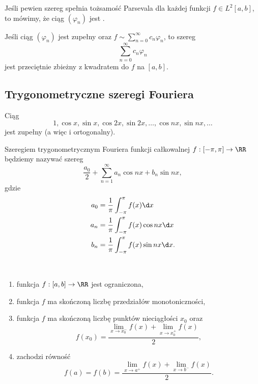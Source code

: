 Jeśli pewien szereg spełnia tożsamość Parsevala dla każdej funkcji $f \in L^2[a, b]$, to mówimy, że ciąg $(\varphi_n)$ jest .

\begin{corollary}
    Jeśli ciąg $(\varphi_n)$ jest zupełny oraz $f \sim \sum_{n=0}^\infty c_n\varphi_n$, to szereg
    \[ \sum_{n=0}^\infty c_n\varphi_n \]
    jest przeciętnie zbieżny z kwadratem do $f$ na $[a, b]$.
\end{corollary}

\subsection{Trygonometryczne szeregi Fouriera}
\begin{fact}
    Ciąg
    \[ 1, \cos x, \sin x, \cos 2x, \sin 2x, \ldots, \cos nx, \sin nx, \ldots \]
    jest zupełny (a więc i ortogonalny).
\end{fact}

\begin{corollary}
    \label{c:Euler-Fourier for trig}
    Szeregiem trygonometrycznym Fouriera funkcji całkowalnej $f : [-\pi, \pi] \to \RR$ będziemy nazywać szereg
    \[ \frac{a_0}{2} + \sum_{n=1}^\infty a_n\cos nx + b_n\sin nx, \]
    gdzie
    \begin{align*}
        a_0 &= \frac{1}{\pi}\int_{-\pi}^\pi f(x) \d x \\
        a_n &= \frac{1}{\pi}\int_{-\pi}^\pi f(x)\cos nx \d x \\
        b_n &= \frac{1}{\pi}\int_{-\pi}^\pi f(x)\sin nx \d x.
    \end{align*}
\end{corollary}

\begin{definition} ~
    \begin{enumerate}
        \item funkcja $f : [a, b] \to \RR$ jest ograniczona,
        \item funkcja $f$ ma skończoną liczbę przedziałów monotoniczności,
        \item funkcja $f$ ma skończoną liczbę punktów nieciągłości $x_0$ oraz
        \[ f(x_0) = \frac{\lim\limits_{x\to x_0^-}f(x) + \lim\limits_{x\to x_0^+}f(x)}{2}, \]
        \item zachodzi równość
        \[ f(a) = f(b) = \frac{\lim\limits_{x\to a^+}f(x) + \lim\limits_{x\to b^-}f(x)}{2}. \]
    \end{enumerate}
\end{definition}


